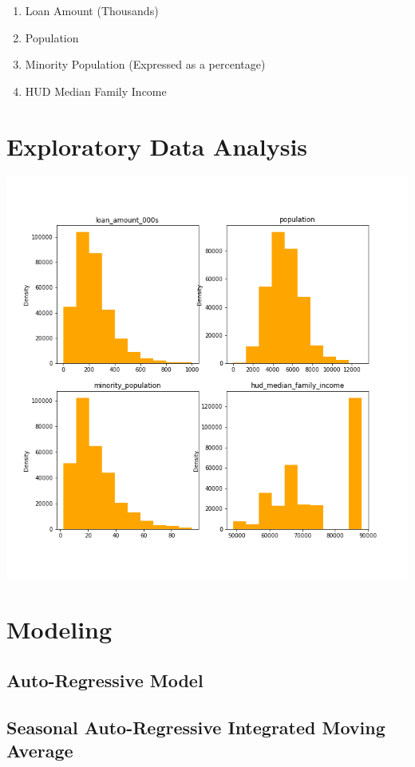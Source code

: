\documentclass{article}
\begin{document}
	\begin{enumerate}
		\item Loan Amount (Thousands)
		\item Population 
		\item Minority Population (Expressed as a percentage)
		\item HUD Median Family Income 
	\end{enumerate}

	\section{Exploratory Data Analysis}
	
	\includegraphics[scale = 0.5]{../plots/hmda_hist.png}
	
	\section{Modeling}
	\subsection{Auto-Regressive Model}
	\subsection{Seasonal Auto-Regressive Integrated Moving Average}
\end{document}
